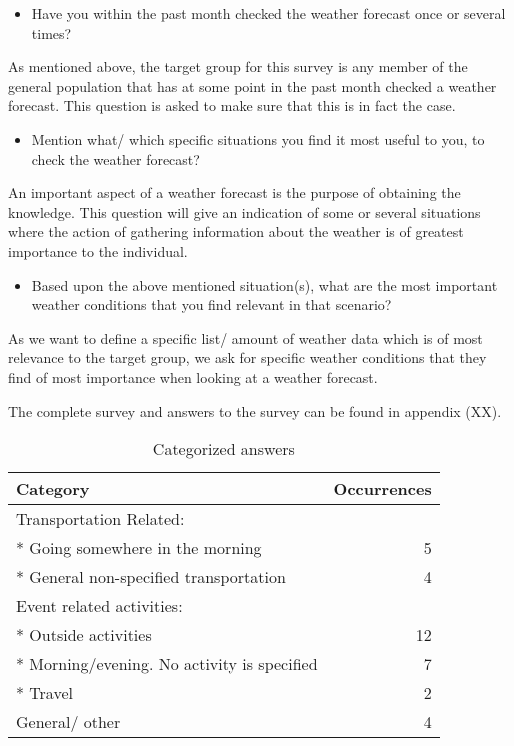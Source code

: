\begin{itemize}
\item Have you within the past month checked the weather forecast once or several times?
\end{itemize}
As mentioned above, the target group for this survey is any member of the general population that has at some point in the past month checked a weather forecast.
This question is asked to make sure that this is in fact the case.

\begin{itemize}
\item Mention what/ which specific situations you find it most useful to you, to check the weather forecast?
\end{itemize}

An important aspect of a weather forecast is the purpose of obtaining the knowledge. 
This question will give an indication of some or several situations where the action of gathering information about the weather is of greatest importance to the individual.

\begin{itemize}
\item Based upon the above mentioned situation(s), what are the most important weather conditions that you find relevant in that scenario?
\end{itemize}

As we want to define a specific list/ amount of weather data which is of most relevance to the target group, we ask for specific weather conditions that they find of most importance when looking at a weather forecast.


The complete survey and answers to the survey can be found in appendix (XX).
\bigskip

\begin{table}[!htbp]
    \centering
    \begin{tabular}{| l | r |}
        \hline
        \textbf{Category} & \textbf{Occurrences}\\
        \hline
        Transportation Related: & \\
        * Going somewhere in the morning & 5 \\
        * General non-specified transportation & 4 \\
        Event related activities: & \\
        * Outside activities & 12 \\
        * Morning/evening. No activity is specified & 7 \\
        * Travel & 2 \\
        General/ other & 4 \\
        \hline
    \end{tabular}
    \caption{Categorized answers} \label{tab:categorizedAnswers}
\end{table}

